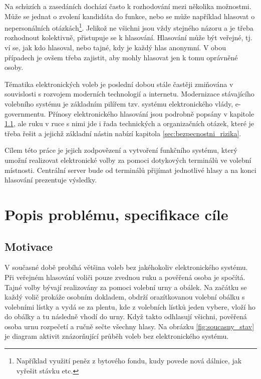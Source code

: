 \documentclass[11pt,twoside,a4paper]{book}
\begin{document}
Na schůzích a zasedáních dochází často k rozhodování mezi několika možnostmi. Může se jednat o zvolení kandidáta do funkce, nebo se může například hlasovat o nepersonálních otázkách\footnote{Například využití peněz z bytového fondu, kudy povede nová dálnice, jak vyřešit stávku etc.}. Jelikož ne všichni jsou vždy stejného názoru a je třeba rozhodnout kolektivně, přistupuje se k hlasování. Hlasování může být veřejné, tj. ví se, jak kdo hlasoval, nebo tajné, kdy je každý hlas anonymní. V obou případech je ovšem třeba zajistit, aby mohly hlasovat jen k tomu oprávněné osoby.

Tématika elektronických voleb je poslední dobou stále častěji zmiňována v souvislosti s rozvojem moderních technologií a internetu. Modernizace stávajícího volebního systému je základním pilířem tzv. systému elektronického vlády, e-governmentu. Přínosy elektronického hlasování jsou podrobně popsány v kapitole \ref{sec:motivace}, ale ruku v ruce s nimi jde i řada technických a organizačních otázek, které je třeba řešit a jejichž základní nástin nabízí kapitola \ref{sec:bezpecnostni_rizika}.

Cílem této práce je jejich zodpovězení a vytvoření funkčního systému, který umožní realizovat elektronické volby za pomoci dotykových terminálů ve volební místnosti. Centrální server bude od terminálů přijímat jednotlivé hlasy a na konci hlasování prezentuje výsledky.


\chapter{Popis problému, specifikace cíle}

\section{Motivace} \label{sec:motivace}

V současné době probíhá většina voleb bez jakéhokoliv elektronického systému. Při veřej\-ném hlasování voliči pouze zvednou ruku a pověřená osoba je spočítá. Tajné volby bývají realizovány za pomoci volební urny a obálek. Na začátku se každý volič prokáže osobním dokladem, obdrží orazítkovanou volební obálku s volebními lístky a vydá se za plentu, kde z volebních lístků jeden vybere, vloží ho do obálky a tu následně vhodí do urny. Když takto odhlasují všichni, pověřená osoba urnu rozpečetí a ručně sečte všechny hlasy. Na obrázku \ref{fig:soucasny_stav} je diagram aktivit znázorňující průběh voleb bez elektronického systému.
\end{document}
